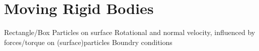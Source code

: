 \section{Moving Rigid Bodies}
	Rectangle/Box
	Particles on surface
	Rotational and normal velocity, influenced by forces/torque on (surface)particles
	Boundry conditions 
